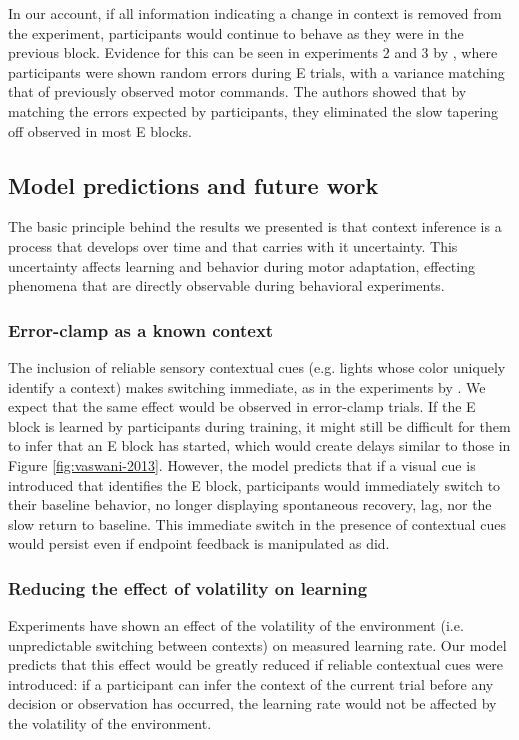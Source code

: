 \documentclass[a4paper,doc,floatsintext,natbib]{apa6}%
\def \fref #1{Figure \ref{#1}}     %
\begin{document}
In our account, if all information indicating a change in context is removed from the experiment, participants would continue to behave as they were in the previous block. Evidence for this can be seen in experiments 2 and 3 by \cite{Vaswani_Decay_2013}, where participants were shown random errors during E trials, with a variance matching that of previously observed motor commands. The authors showed that by matching the errors expected by participants, they eliminated the slow tapering off observed in most E blocks.



\subsection{Model predictions and future work}
The basic principle behind the results we presented is that context inference is a process that develops over time and that carries with it uncertainty. This uncertainty affects learning and behavior during motor adaptation, effecting phenomena that are directly observable during behavioral experiments.

\subsubsection{Error-clamp as a known context}
The inclusion of reliable sensory contextual cues (e.g. lights whose color uniquely identify a context) makes switching immediate, as in the experiments by \cite{Kim_Neural_2015}. We expect that the same effect would be observed in error-clamp trials. If the E block is learned by participants during training, it might still be difficult for them to infer that an E block has started, which would create delays similar to those in \fref{fig:vaswani-2013}. However, the model predicts that if a visual cue is introduced that identifies the E block, participants would immediately switch to their baseline behavior, no longer displaying spontaneous recovery, lag, nor the slow return to baseline. This immediate switch in the presence of contextual cues would persist even if endpoint feedback is manipulated as \cite{Vaswani_Decay_2013} did.

\subsubsection{Reducing the effect of volatility on learning}
Experiments \citep{Herzfeld_memory_2014} have shown an effect of the volatility of the environment (i.e. unpredictable switching between contexts) on measured learning rate. Our model predicts that this effect would be greatly reduced if reliable contextual cues were introduced: if a participant can infer the context of the current trial before any decision or observation has occurred, the learning rate would not be affected by the volatility of the environment.
\end{document}
